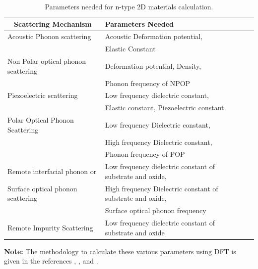 \documentclass[12pt]{article}
\begin{document}
\begin{table} [H]
\centering
\caption{Parameters needed for n-type 2D materials calculation.}
\label{DFT_2D}
\begin{tabular}{|l|l|l|}
\hline
\multicolumn{1}{|c|}{\textbf{Scattering Mechanism}} & {\textbf{Parameters Needed}} \\
\hline                                      
Acoustic Phonon scattering   & Acoustic Deformation potential, \\
 & Elastic Constant \\
\hline   
Non Polar optical phonon scattering & Deformation potential, Density,  \\ 
 & Phonon frequency of NPOP \\
\hline  
Piezoelectric scattering & Low frequency dielectric constant, \\
 & Elastic constant, Piezoelectric constant \\ 
\hline
Polar Optical Phonon Scattering & Low frequency Dielectric constant, \\
 & High frequency Dielectric constant,  \\
 & Phonon frequency of POP \\
\hline
Remote interfacial phonon or & Low frequency dielectric constant of substrate and oxide, \\
Surface optical phonon scattering  & High frequency Dielectric constant of substrate and oxide, \\
 & Surface optical phonon frequency \\
\hline
Remote Impurity Scattering & Low frequency dielectric constant of substrate and oxide \\
\hline

\end{tabular}
\end{table}

\textbf{Note:} The methodology to calculate these various parameters using DFT is given in the references \cite{anup1}, \cite{anup2}, \cite{anup3} and \cite{koshi2023}. 
\end{document}
